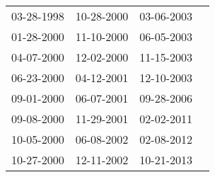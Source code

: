 \begin{supertabular}{llll}
 03-28-1998 &  10-28-2000 &  03-06-2003 \\
 01-28-2000 &  11-10-2000 &  06-05-2003 \\
 04-07-2000 &  12-02-2000 &  11-15-2003 \\
 06-23-2000 &  04-12-2001 &  12-10-2003 \\
 09-01-2000 &  06-07-2001 &  09-28-2006 \\
 09-08-2000 &  11-29-2001 &  02-02-2011 \\
 10-05-2000 &  06-08-2002 &  02-08-2012 \\
 10-27-2000 &  12-11-2002 &  10-21-2013 \\
\end{supertabular}
